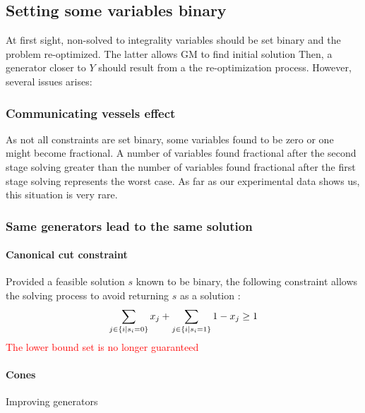 \subsection{Setting some variables binary}
At first sight, non-solved to integrality variables should be set binary and the problem re-optimized. The latter allows GM to find initial solution Then, a generator closer to $Y$ should result from a the re-optimization process. However, several issues arises:

\subsubsection{Communicating vessels effect}
As not all constraints are set binary, some variables found to be zero or one might become fractional. 
A number of variables found fractional after the second stage solving greater than the number of variables found fractional after the first stage solving represents the worst case. 
As far as our experimental data shows us, this situation is very rare.
\subsubsection{Same generators lead to the same solution}
\paragraph{Canonical cut constraint}
Provided a feasible solution $s$ known to be binary, the following constraint allows the solving process to avoid returning $s$ as a solution \cite{canonical_cut}:
\[
\sum_{j \in \left\lbrace i \mid s_i = 0 \right\rbrace}x_j +  \sum_{j \in \left\lbrace i \mid s_i = 1 \right\rbrace}1-x_j \geq 1
\]
\textcolor{red}{The lower bound set is no longer guaranteed}
\paragraph{Cones}

\begin{algorithm}
\caption{Improving generators}\label{alg:Generators_improvement}
\end{algorithm}
